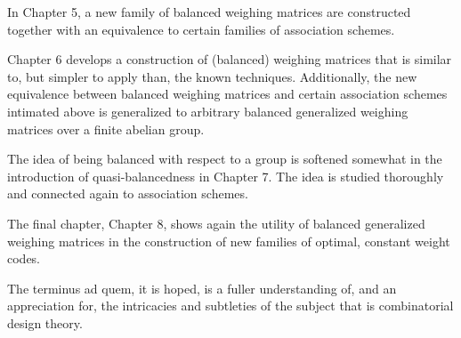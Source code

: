 \documentclass[../../main]{subfiles}
\begin{document}
 In Chapter 5, a new family of balanced weighing matrices are constructed together with an equivalence to certain families of association schemes.
 
 Chapter 6 develops a construction of (balanced) weighing matrices that is similar to, but simpler to apply than, the known techniques. Additionally, the new equivalence between balanced weighing matrices and certain association schemes intimated above is generalized to arbitrary balanced generalized weighing matrices over a finite abelian group.
 
 The idea of being balanced with respect to a group is softened somewhat in the introduction of quasi-balancedness in Chapter 7. The idea is studied thoroughly and connected again to association schemes.
 
 The final chapter, Chapter 8, shows again the utility of balanced generalized weighing matrices in the construction of new families of optimal, constant weight codes.
 
 The terminus ad quem, it is hoped, is a fuller understanding of, and an appreciation for, the intricacies and subtleties of the subject that is combinatorial design theory.
 
\end{document}
